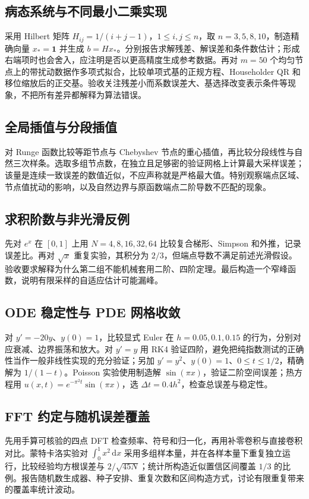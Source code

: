 \documentclass[UTF8,12pt,a4paper,fontset=fandol]{ctexbook}
\begin{document}
\subsection{病态系统与不同最小二乘实现}
采用 Hilbert 矩阵 $H_{ij}=1/(i+j-1)$，$1\le i,j\le n$，取 $n=3,5,8,10$，制造精确向量 $x_*=\boldsymbol1$ 并生成 $b=Hx_*$。分别报告求解残差、解误差和条件数估计；形成右端项时也会舍入，应注明是否以更高精度生成参考数据。再对 $m=50$ 个均匀节点上的带扰动数据作多项式拟合，比较单项式基的正规方程、Householder QR 和移位缩放后的正交基。验收关注残差小而系数误差大、基选择改变表示条件等现象，不把所有差异都解释为算法错误。

\subsection{全局插值与分段插值}
对 Runge 函数比较等距节点与 Chebyshev 节点的重心插值，再比较分段线性与自然三次样条。选取多组节点数，在独立且足够密的验证网格上计算最大采样误差；该量是连续一致误差的数值近似，不应声称就是严格最大值。特别观察端点区域、节点值扰动的影响，以及自然边界与原函数端点二阶导数不匹配的现象。

\subsection{求积阶数与非光滑反例}
先对 $e^x$ 在 $[0,1]$ 上用 $N=4,8,16,32,64$ 比较复合梯形、Simpson 和外推，记录误差比。再对 $\sqrt x$ 重复实验，其积分为 $2/3$，但端点导数不满足前述光滑假设。验收要求解释为什么第二组不能机械套用二阶、四阶定理。最后构造一个窄峰函数，说明有限采样的自适应估计可能漏峰。

\subsection{ODE 稳定性与 PDE 网格收敛}
对 $y'=-20y$、$y(0)=1$，比较显式 Euler 在 $h=0.05,0.1,0.15$ 的行为，分别对应衰减、边界振荡和放大。对 $y'=y$ 用 RK4 验证四阶，避免把纯指数测试的正确性当作一般非线性实现的充分验证；另加 $y'=y^2$、$y(0)=1$、$0\le t\le1/2$，精确解为 $1/(1-t)$。Poisson 实验使用制造解 $\sin(\pi x)$，验证二阶空间误差；热方程用 $u(x,t)=e^{-\pi^2t}\sin(\pi x)$，选 $\Delta t=0.4h^2$，检查总误差与稳定性。

\subsection{FFT 约定与随机误差覆盖}
先用手算可核验的四点 DFT 检查频率、符号和归一化，再用补零卷积与直接卷积对比。蒙特卡洛实验对 $\int_0^1x^2\,\mathrm dx$ 采用多组样本量，并在各样本量下重复独立运行，比较经验均方根误差与 $2/\sqrt{45N}$；统计所构造近似置信区间覆盖 $1/3$ 的比例。报告随机数生成器、种子安排、重复次数和区间构造方式，讨论有限重复带来的覆盖率统计波动。
\end{document}
